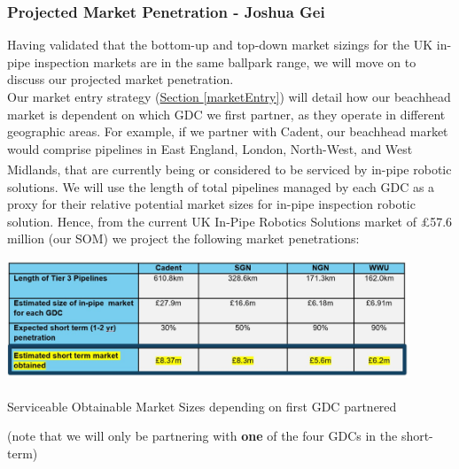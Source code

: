 \documentclass[11pt]{article}		%
\newcommand{\supercite}[1]{\textsuperscript{\cite{#1}}}		%
\newcommand{\sectref}[1]{\hyperref[#1]{Section \ref*{#1}}}     %
\begin{document}
    \subsubsection[Projected Market Penetration]{Projected Market Penetration - Joshua Gei}\label{marketPenSect}
    
    Having validated that the bottom-up and top-down market sizings for the UK in-pipe inspection markets are in the same ballpark range, we will move on to discuss our projected market penetration.
    \\
     \hspace*{3ex}Our market entry strategy (\sectref{marketEntry}) will detail how our beachhead market is dependent on which GDC we first partner, as they operate in different geographic areas. For example, if we partner with Cadent, our beachhead market would comprise pipelines in East England, London, North-West, and West Midlands\supercite{cadentarea}, that are currently being or considered to be serviced by in-pipe robotic solutions.
        \hspace*{3ex}We will use the length of total pipelines managed by each GDC as a proxy for their relative potential market sizes for in-pipe inspection robotic solution. Hence, from the current UK In-Pipe Robotics Solutions market of £57.6 million (our SOM) we project the following market penetrations: 
        
		\begin{table}[h]
			\centering
			\includegraphics[width=0.9\textwidth]{SOM.jpg}
			\caption{Serviceable Obtainable Market Sizes depending on first GDC partnered\supercite{ltd}}
			\label{SOM}
 		\end{table}
    
    (note that we will only be partnering with \textbf{one} of the four GDCs in the short-term)
    
\end{document}
